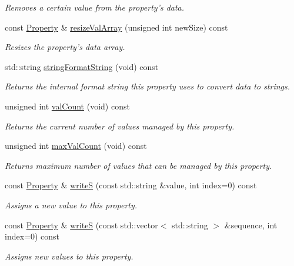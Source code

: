 \begin{DoxyCompactItemize}
\begin{DoxyCompactList}\small\item\em Removes a certain value from the property's data. \end{DoxyCompactList}\item 
const \hyperlink{classmv_i_m_p_a_c_t_1_1acquire_1_1_property}{Property} \& \hyperlink{classmv_i_m_p_a_c_t_1_1acquire_1_1_property_a3b96fcc3fe07052044d762dcb219e236}{resize\+Val\+Array} (unsigned int new\+Size) const 
\begin{DoxyCompactList}\small\item\em Resizes the property's data array. \end{DoxyCompactList}\item 
std\+::string \hyperlink{classmv_i_m_p_a_c_t_1_1acquire_1_1_property_ad267e140bfb73254855b3792cd0d6f5d}{string\+Format\+String} (void) const 
\begin{DoxyCompactList}\small\item\em Returns the internal format string this property uses to convert data to strings. \end{DoxyCompactList}\item 
unsigned int \hyperlink{classmv_i_m_p_a_c_t_1_1acquire_1_1_property_af78d846031ef0e00abc302c7bed86944}{val\+Count} (void) const 
\begin{DoxyCompactList}\small\item\em Returns the current number of values managed by this property. \end{DoxyCompactList}\item 
unsigned int \hyperlink{classmv_i_m_p_a_c_t_1_1acquire_1_1_property_a3fa6dd31fb10a3dd278320d07fb40ac8}{max\+Val\+Count} (void) const 
\begin{DoxyCompactList}\small\item\em Returns maximum number of values that can be managed by this property. \end{DoxyCompactList}\item 
const \hyperlink{classmv_i_m_p_a_c_t_1_1acquire_1_1_property}{Property} \& \hyperlink{classmv_i_m_p_a_c_t_1_1acquire_1_1_property_a51893d14c0fc6128bc9f4cc0ba5a7e5d}{write\+S} (const std\+::string \&value, int index=0) const 
\begin{DoxyCompactList}\small\item\em Assigns a new value to this property. \end{DoxyCompactList}\item 
const \hyperlink{classmv_i_m_p_a_c_t_1_1acquire_1_1_property}{Property} \& \hyperlink{classmv_i_m_p_a_c_t_1_1acquire_1_1_property_a49c7ecf0cf3198e9b29e1db1c99a2b2b}{write\+S} (const std\+::vector$<$ std\+::string $>$ \&sequence, int index=0) const 
\begin{DoxyCompactList}\small\item\em Assigns new values to this property. \end{DoxyCompactList}\end{DoxyCompactItemize}
